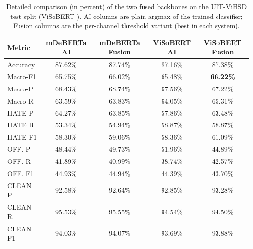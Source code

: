 \begin{table}[ht]
\centering
\scriptsize
\setlength{\tabcolsep}{2pt}
\caption{Detailed comparison (in percent) of the two fused backbones on the UIT-ViHSD \cite{luu2021vihsd} test split (ViSoBERT \cite{nguyen2023visobert}).
AI columns are plain argmax of the trained classifier; Fusion columns are the
per-channel threshold variant (best in each system).}
\label{tab:model-comparison}
\begin{tabular}{lcccc}
\toprule
Metric & mDeBERTa AI & mDeBERTa Fusion & ViSoBERT AI & ViSoBERT Fusion \\
\midrule
Accuracy      & 87.62\% & 87.74\% & 87.16\% & 87.38\% \\
Macro-F1      & 65.75\% & 66.02\% & 65.48\% & \textbf{66.22\%} \\
Macro-P       & 68.43\% & 68.74\% & 67.56\% & 67.22\% \\
Macro-R       & 63.59\% & 63.83\% & 64.05\% & 65.31\% \\
\midrule
HATE P        & 64.27\% & 63.85\% & 57.86\% & 63.48\% \\
HATE R        & 53.34\% & 54.94\% & 58.87\% & 58.87\% \\
HATE F1       & 58.30\% & 59.06\% & 58.36\% & 61.09\% \\
\midrule
OFF. P        & 48.44\% & 49.73\% & 51.96\% & 44.89\% \\
OFF. R        & 41.89\% & 40.99\% & 38.74\% & 42.57\% \\
OFF. F1       & 44.93\% & 44.94\% & 44.39\% & 43.70\% \\
\midrule
CLEAN P       & 92.58\% & 92.64\% & 92.85\% & 93.28\% \\
CLEAN R       & 95.53\% & 95.55\% & 94.54\% & 94.50\% \\
CLEAN F1      & 94.03\% & 94.07\% & 93.69\% & 93.88\% \\
\bottomrule
\end{tabular}
\end{table}

